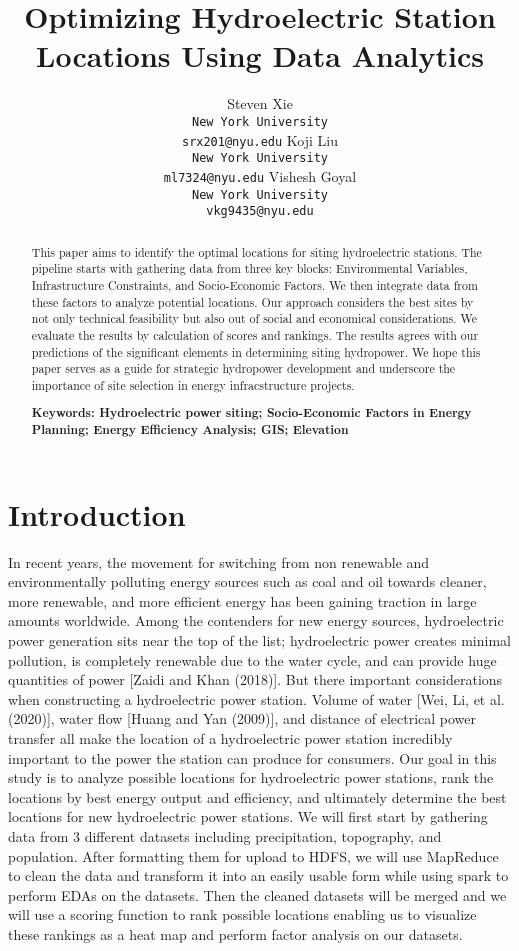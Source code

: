 \documentclass[11pt]{article}
\title{Optimizing Hydroelectric Station Locations Using Data Analytics}
\author{
Steven Xie\\
\texttt{\normalfont New York University}\\
\texttt{\small srx201@nyu.edu}
\And
Koji Liu\\
\texttt{\normalfont New York University}\\
\texttt{\small ml7324@nyu.edu}
\And
Vishesh Goyal\\
\texttt{\normalfont New York University}\\
\texttt{\small vkg9435@nyu.edu}
}
\begin{document}
\maketitle
\begin{abstract}
This paper aims to identify the optimal locations for siting hydroelectric stations. The pipeline starts with gathering data from three key blocks: Environmental Variables, Infrastructure Constraints, and Socio-Economic Factors. We then integrate data from these factors to analyze potential locations. Our approach considers the best sites by not only technical feasibility but also out of social and economical considerations. We evaluate the results by calculation of scores and rankings. The results agrees with our predictions of the significant elements in determining siting hydropower. We hope this paper serves as a guide for strategic hydropower development and underscore the importance of site selection in energy infracstructure projects.

\textbf{Keywords: Hydroelectric power siting; Socio-Economic Factors in Energy Planning; Energy Efficiency Analysis; GIS; Elevation} 
\end{abstract}


\section{Introduction}
In recent years, the movement for switching from non renewable and environmentally polluting energy sources such as coal and oil towards cleaner, more renewable, and more efficient energy has been gaining traction in large amounts worldwide. Among the contenders for new energy sources, hydroelectric power generation sits near the top of the list; hydroelectric power creates minimal pollution, is completely renewable due to the water cycle, and can provide huge quantities of power [Zaidi and Khan (2018)]. But there important considerations when constructing a hydroelectric power station. Volume of water [Wei, Li, et al. (2020)], water flow [Huang and Yan (2009)], and distance of electrical power transfer all make the location of a hydroelectric power station incredibly important to the power the station can produce for consumers. Our goal in this study is to analyze possible locations for hydroelectric power stations, rank the locations by best energy output and efficiency, and ultimately determine the best locations for new hydroelectric power stations. We will first start by gathering data from 3 different datasets including precipitation, topography, and population. After formatting them for upload to HDFS, we will use MapReduce to clean the data and transform it into an easily usable form while using spark to perform EDAs on the datasets. Then the cleaned datasets will be merged and we will use a scoring function to rank possible locations enabling us to visualize these rankings as a heat map and perform factor analysis on our datasets.
\end{document}
